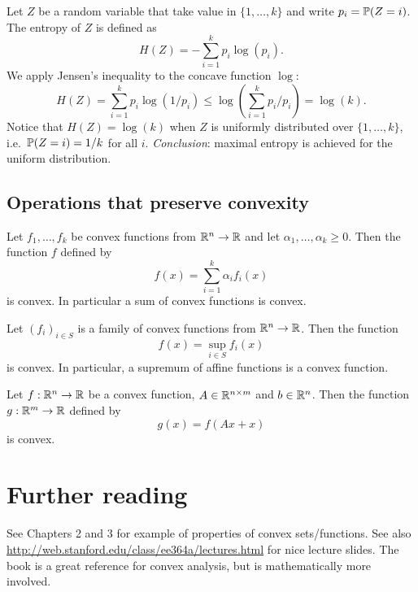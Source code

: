 \documentclass[11pt,nocut]{article}
\begin{document}
\begin{example}
	Let $Z$ be a random variable that take value in $\{1, \dots, k\}$ and write $p_i = \P(Z = i)$. The entropy of $Z$ is defined as
	$$
	H(Z) = - \sum_{i=1}^k p_i \log(p_i).
	$$
	We apply Jensen's inequality to the concave function $\log$:
	$$
	H(Z) = \sum_{i=1}^k p_i \log(1/p_i) \leq \log\left(\sum_{i=1}^k p_i / p_i\right) = \log(k).
	$$
	Notice that $H(Z) = \log(k)$ when $Z$ is uniformly distributed over $\{1,\dots,k\}$, i.e.\ $\P(Z=i) = 1/k$ for all $i$. \emph{Conclusion}: maximal entropy is achieved for the uniform distribution.
\end{example}


\subsection{Operations that preserve convexity}

\begin{proposition}
	Let $f_1, \dots, f_k$ be convex functions from $\R^n \to \R$ and let $\alpha_1, \dots, \alpha_k \geq 0$. Then the function $f$ defined by
	$$
	f(x) = \sum_{i=1}^k \alpha_i f_i(x)
	$$
	is convex. In particular a sum of convex functions is convex.
\end{proposition}

\begin{proposition}
	Let $(f_i)_{i \in S}$ is a family of convex functions from $\R^n \to \R$. Then the function
	$$
	f(x) = \sup_{i \in S} f_i(x)
	$$
	is convex. In particular, a supremum of affine functions is a convex function.
\end{proposition}

\begin{proposition}
	Let $f: \R^n \to \R$ be a convex function, $A \in \R^{n \times m}$ and $b\in\R^n$.
	Then the function $g: \R^m \to \R$ defined by
	$$
	g(x) = f(Ax + x)
	$$
	is convex.
\end{proposition}


\section*{Further reading}

See \cite{boyd2004convex} Chapters 2 and 3 for example of properties of convex sets/functions. See also \url{http://web.stanford.edu/class/ee364a/lectures.html} for nice lecture slides.
The book \cite{rockafellar1970convex} is a great reference for convex analysis, but is mathematically more involved.


\vspace{1cm}
\centerline{}




\end{document}
